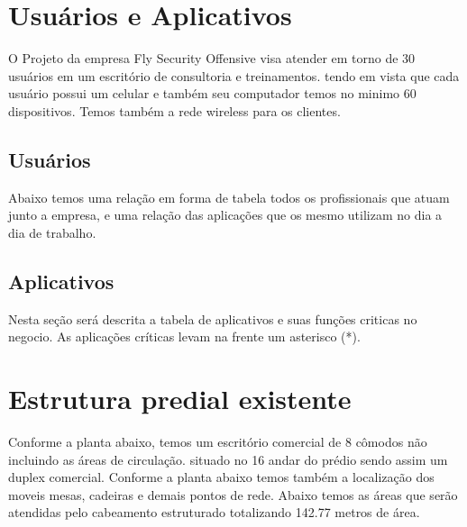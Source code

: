 \documentclass[	DIV=calc,%
							paper=a4,%
							fontsize=12pt,%
							onecolumn]{scrartcl}	 					%
\begin{document}
\section{Usuários e Aplicativos}
O Projeto da empresa Fly Security Offensive visa atender em torno de 30 usuários em um escritório de consultoria e treinamentos. tendo em vista que cada usuário possui um celular e também seu computador temos no minimo 60 dispositivos. Temos também a rede wireless para os clientes.
 

\subsection{Usuários}
Abaixo temos uma relação em forma de tabela todos os profissionais que atuam junto a empresa, e uma relação das aplicações que os mesmo utilizam no dia a dia de trabalho.




\pagebreak

\subsection{Aplicativos}
Nesta seção será descrita a tabela de aplicativos e suas funções criticas no negocio. As aplicações críticas levam na frente um asterisco (*).





\section{Estrutura predial existente}
Conforme a planta abaixo, temos um escritório comercial de 8 cômodos não incluindo as áreas de circulação. situado no 16 andar do prédio sendo assim um duplex comercial. Conforme a planta abaixo temos também a localização dos moveis mesas, cadeiras e demais pontos de rede.  
\bigskip
Abaixo temos as áreas que serão atendidas pelo cabeamento estruturado totalizando 142.77 metros de área.
 
\end{document}
